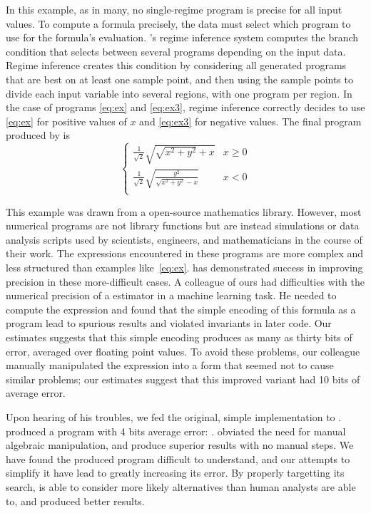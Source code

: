 \documentclass[paper.tex]{subfiles}
\begin{document}
In this example, as in many,
  no single-regime program is precise for all input values.
To compute a formula precisely, the data must select
  which program to use for the formula's evaluation.
\casio's regime inference system
  computes the branch condition
  that selects between several programs depending on the input data.
Regime inference creates this condition
  by considering all generated programs
  that are best on at least one sample point,
  and then using the sample points to divide each input variable
  into several regions, with one program per region.
In the case of programs \eqref{eq:ex} and \eqref{eq:ex3},
  regime inference correctly decides
  to use \eqref{eq:ex} for positive values of $x$
  and \eqref{eq:ex3} for negative values.
The final program produced by \casio is
\[
\begin{cases}
  \frac1{\sqrt2} \sqrt{\sqrt{x^2 + y^2} + x} & x \ge 0 \\
  \frac1{\sqrt2} \sqrt{\frac{y^2}{\sqrt{x^2 + y^2} - x}} & x < 0 \\
\end{cases}
\]

This example was drawn from a open-source mathematics library.
However, most numerical programs are not library functions
  but are instead simulations or data analysis scripts
  used by scientists, engineers, and mathematicians
  in the course of their work.
The expressions encountered in these programs are more complex
  and less structured than examples like~\eqref{eq:ex}.
\casio has demonstrated success in improving precision
  in these more-difficult cases.
A colleague of ours had difficulties with the numerical precision
  of a estimator in a machine learning task.
He needed to compute the expression
  and found that the simple encoding of this formula as a program
  lead to spurious results and violated invariants in later code.
Our estimates suggests that this simple encoding produces
  as many as thirty bits of error, averaged over floating point values.
To avoid these problems,
  our colleague manually manipulated the expression
  into a form that seemed not to cause similar problems;
  our estimates suggest that this improved variant
  had 10 bits of average error.

Upon hearing of his troubles,
  we fed the original, simple implementation to \casio.
\casio produced a program with 4 bits average error:
  .
\casio obviated the need for manual algebraic manipulation,
  and produce superior results with no manual steps.
We have found the produced program difficult to understand,
  and our attempts to simplify it
  have lead to greatly increasing its error.
By properly targetting its search,
  \casio is able to consider more likely alternatives
  than human analysts are able to,
  and produced better results.
\end{document}

